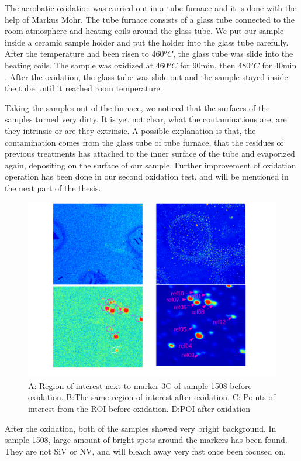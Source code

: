 The aerobatic oxidation was carried out in a tube furnace and it is done with the help of Markus Mohr. The tube furnace consists of a glass tube connected to the room atmosphere and heating coils around the glass tube. We put our sample inside a ceramic sample holder and put the holder into the glass tube carefully. After the temperature had been risen to 460$^{o}C$, the glass tube was slide into the heating coils. The sample was oxidized at 460$^{o}C$ for 90min, then 480$^{o}C$ for 40min \citep{neu_low_2013}. After the oxidation, the glass tube was slide out and the sample stayed inside the tube until it reached room temperature.

Taking the samples out of the furnace, we noticed that the surfaces of the samples turned very dirty. It is yet not clear, what the contaminations are, are they intrinsic or are they extrinsic. A possible explanation is that, the contamination comes from the glass tube of tube furnace, that the residues of previous treatments has attached to the inner surface of the tube and evaporized again, depositing on the surface of our sample. Further improvement of oxidation operation has been done in our second oxidation test, and will be mentioned in the next part of the thesis.
\begin{figure}[h]
\centering
\includegraphics[width=0.7\linewidth]{Figures/pic/oxidation}
\caption{A: Region of interest next to marker 3C of sample 1508 before oxidation. B:The same region of interest after oxidation. C: Points of interest from the ROI before oxidation. D:POI after oxidation}
\label{fig:oxidation}
\end{figure}

After the oxidation, both of the samples showed very bright background. In sample 1508, large amount of bright spots around the markers has been found. They are not SiV or NV, and will bleach away very fast once been focused on.


